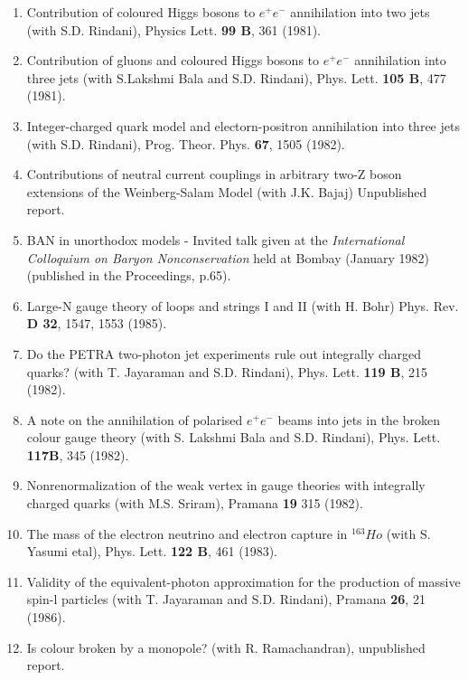 \begin{enumerate}
\item Contribution of coloured Higgs bosons to $e^+ e^-$ annihilation
into two jets (with S.D. Rindani), Physics Lett. {\bf 99 B}, 361 (1981).

\item Contribution of gluons and coloured Higgs bosons to $e^+ e^-$
annihilation into three jets (with S.Lakshmi Bala and S.D. Rindani), 
Phys. Lett. {\bf 105 B}, 477 (1981).

\item Integer-charged quark model and electorn-positron annihilation
into three jets (with S.D. Rindani), Prog. Theor. Phys. {\bf 67}, 1505 (1982).

\item Contributions of neutral current couplings in arbitrary two-Z
boson extensions of the Weinberg-Salam Model (with J.K. Bajaj)
Unpublished report.

\item BAN in unorthodox models - Invited talk given at the {\it International
Colloquium on Baryon Nonconservation} held at Bombay (January 1982)
(published in the Proceedings, p.65).

\item Large-N gauge theory of loops and strings I and II (with H. Bohr)
Phys. Rev. {\bf D 32}, 1547, 1553 (1985).

\item Do the PETRA two-photon jet experiments rule out integrally
charged quarks?  (with T. Jayaraman and S.D. Rindani), Phys. Lett. {\bf
119 B}, 215 (1982).

\item A note on the annihilation of polarised $e^+ e^-$ beams into jets
in the broken colour gauge theory (with S. Lakshmi Bala and S.D.
Rindani), Phys. Lett. {\bf 117B}, 345 (1982).

\item Nonrenormalization of the weak vertex in gauge theories with
integrally charged quarks (with M.S. Sriram), Pramana {\bf 19} 315
(1982). 

\item The mass of the electron neutrino and electron capture in
$^{163}Ho$ (with S. Yasumi etal), Phys. Lett. {\bf 122 B}, 461 (1983).

\item Validity of the equivalent-photon approximation for the production
of massive spin-l particles (with T. Jayaraman and S.D. Rindani), Pramana
{\bf 26}, 21 (1986).

\item Is colour broken by a monopole? (with R. Ramachandran), 
unpublished report.


\end{enumerate}
